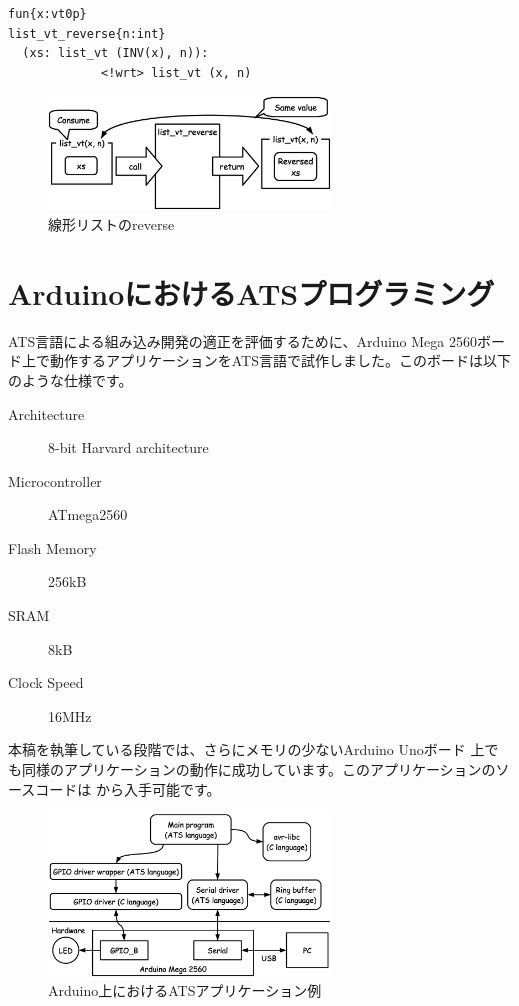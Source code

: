 \documentclass{ipsjprosym}
\begin{document}
\vspace{3mm}
\begin{verbatim}
fun{x:vt0p}
list_vt_reverse{n:int}
  (xs: list_vt (INV(x), n)):
             <!wrt> list_vt (x, n)
\end{verbatim}
\vspace{3mm}

\begin{figure}[h]
\centering
\includegraphics[width=75mm]{draw/list_vt_reverse.eps}
\caption{線形リストのreverse}
\label{fig:list_vt_reverse}
\end{figure}

\section{ArduinoにおけるATSプログラミング}

ATS言語による組み込み開発の適正を評価するために、Arduino Mega 2560ボード上で動作するアプリケーションをATS言語で試作しました。このボードは以下のような仕様です。

\vspace{3mm}
\begin{description}
  \item[Architecture] 8-bit Harvard architecture
  \item[Microcontroller] ATmega2560
  \item[Flash Memory] 256kB
  \item[SRAM] 8kB
  \item[Clock Speed] 16MHz
\end{description}
\vspace{3mm}

本稿を執筆している段階では、さらにメモリの少ないArduino Unoボード \cite{arduino-uno} 上でも同様のアプリケーションの動作に成功しています。このアプリケーションのソースコードは \cite{arduino-ats} から入手可能です。

\begin{figure}[h]
\centering
\includegraphics[width=75mm]{draw/demo_ats_arduino.eps}
\caption{Arduino上におけるATSアプリケーション例}
\label{fig:demo_ats_arduino}
\end{figure}
\end{document}
